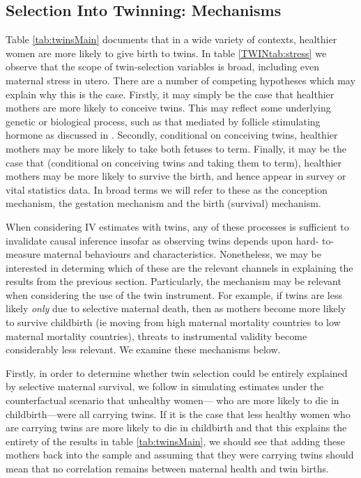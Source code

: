 \documentclass[subeqn]{article}
\begin{document}
\begin{spacing}{1.4}


\subsection{Selection Into Twinning: Mechanisms}   \label{TWINsscn:selection}
Table \ref{tab:twinsMain} documents that in a wide variety of contexts,
healthier women are more likely to give birth to twins.  In table
\ref{TWINtab:stress} we observe that the scope of twin-selection variables is
broad, including even maternal stress in utero.  There are a number of competing
hypotheses which may explain why this is the case.  Firstly, it may simply be
the case that healthier mothers are more likely to conceive twins.  This may
reflect some underlying genetic or biological process, 
such as that mediated by follicle stimulating hormone as discussed in 
\citet{Hall2003}.  Secondly, conditional on conceiving twins, healthier mothers 
may be more likely to take both fetuses to term.  Finally, it may be the case 
that (conditional on conceiving twins and taking them to term), healthier mothers 
may be more likely to survive the birth, and hence appear in survey or vital 
statistics data.  In broad terms we will refer to these as the conception 
mechanism, the gestation mechanism and the birth (survival) mechanism.

When considering IV estimates with twins, any of these processes is sufficient 
to invalidate causal inference insofar as observing twins depends upon hard-%
to-measure maternal behaviours and characteristics.  Nonetheless, we may be 
interested in determing which of these are the relevant channels in explaining 
the results from the previous section.  Particularly, the mechanism may be 
relevant when considering the use of the twin instrument.  For example, if twins
are less likely \emph{only} due to selective maternal death, then as mothers
become more likely to survive childbirth (ie moving from high maternal mortality 
countries to low maternal mortality countries), threats to instrumental validity 
become considerably less relevant.  We examine these mechanisms below.

Firstly, in order to determine whether twin selection could be entirely
explained by selective maternal survival, we follow \citet{Aldermanetal2011} in
simulating estimates under the counterfactual scenario that unhealthy women---%
who are more likely to die in childbirth---were all carrying twins.  If it is
the case that less healthy women who are carrying twins are more likely to die
in childbirth and that this explains the entirety of the results in table
\ref{tab:twinsMain}, we should see that adding these mothers back into the
sample and assuming that they were carrying twins should mean that no
correlation remains between maternal health and twin births.


\end{spacing}
\end{document}
